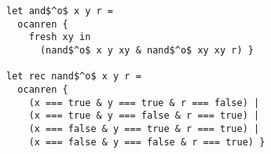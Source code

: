 \begin{lstlisting}
let and$^o$ x y r =
  ocanren {
    fresh xy in
      (nand$^o$ x y xy & nand$^o$ xy xy r) }

let rec nand$^o$ x y r =
  ocanren {
    (x === true & y === true & r === false) |
    (x === true & y === false & r === true) |
    (x === false & y === true & r === true) |
    (x === false & y === false & r === true) }
\end{lstlisting}